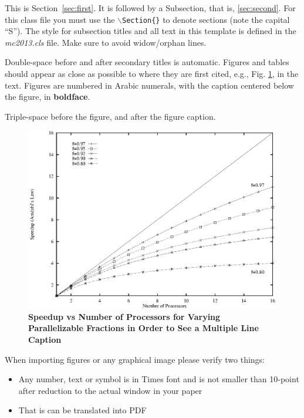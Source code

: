 \documentclass{mc2013}
\begin{document}
\label{sec:first}

This is Section~\ref{sec:first}. It is followed by a Subsection, that is, 
\ref{sec:second}. For this class file you must use the 
\texttt{$\backslash$Section\{\}} to denote sections (note the capital ``S'').  
The style for subsection titles and all text in this template is defined in 
the {\it mc2013.cls} file.  Make sure to avoid widow/orphan lines.


\label{sec:second}

Double-space before and after secondary titles is automatic.  Figures and 
tables should appear as close as possible to where they are first
cited, e.g., Fig. \ref{fig:amdahl}, in the text.  Figures are numbered in 
Arabic numerals, with the caption centered below the figure, in 
{\bf boldface}.
  
Triple-space before the figure, and after the figure caption.

%
\vspace{16pt}
\begin{figure}[!htb]
\begin{spacing}{1.0}
\centering
\includegraphics[scale=0.60]{./figure.eps}
\caption{\bf Speedup vs Number of Processors for Varying Parallelizable 
Fractions in Order to See a Multiple Line Caption} 
\label{fig:amdahl}
\end{spacing}
\end{figure}
\vspace{16pt}
%

When importing figures or any graphical image please verify two things:
\begin{itemize}
\item Any number, text or symbol is in Times font and is not smaller than 
    10-point after reduction to the actual window in your paper
\item That is can be translated into PDF
\end{itemize}
\end{document}
